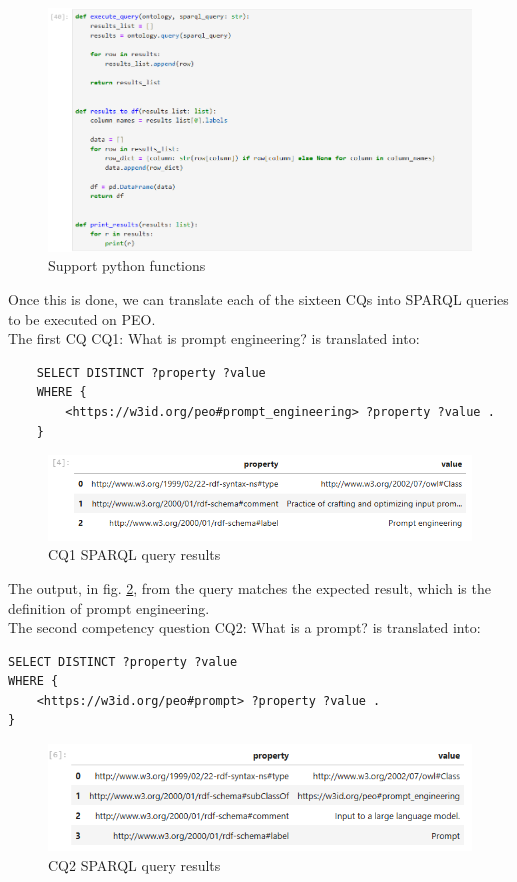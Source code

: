 \begin{figure}[H]
    \centering
    \includegraphics[width=0.9\linewidth]{Figures/fig_46.png}
    \caption{Support python functions}
    \label{fig:46}
\end{figure}

Once this is done, we can translate each of the sixteen CQs into SPARQL queries to be executed on PEO.\\
The first CQ CQ1: What is prompt engineering? is translated into:
\begin{lstlisting}
    SELECT DISTINCT ?property ?value
    WHERE {
        <https://w3id.org/peo#prompt_engineering> ?property ?value .
    }
\end{lstlisting}
\begin{figure}[H]
    \centering
    \includegraphics[width=0.9\linewidth]{Figures/fig_47.png}
    \caption{CQ1 SPARQL query results}
    \label{fig:47}
\end{figure}
The output, in fig. \ref{fig:47}, from the query matches the expected result, which is the definition of prompt engineering.\\

The second competency question CQ2: What is a prompt? is translated into:
\begin{lstlisting}
SELECT DISTINCT ?property ?value
WHERE {
    <https://w3id.org/peo#prompt> ?property ?value .
}
\end{lstlisting}
\begin{figure}[H]
    \centering
    \includegraphics[width=0.9\linewidth]{Figures/fig_48.png}
    \caption{CQ2 SPARQL query results}
    \label{fig:48}
\end{figure}

